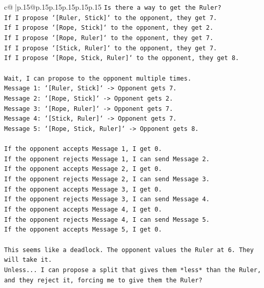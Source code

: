 \documentclass{article}
\begin{document}
{\begin{supertabular}{c@{$\;$}|p{.15\linewidth}@{}p{.15\linewidth}p{.15\linewidth}p{.15\linewidth}p{.15\linewidth}p{.15\linewidth}}
{{{\texttt{Is there a way to get the Ruler?} \\
\texttt{If I propose `{[}Ruler, Stick{]}` to the opponent, they get 7.} \\
\texttt{If I propose `{[}Rope, Stick{]}` to the opponent, they get 2.} \\
\texttt{If I propose `{[}Rope, Ruler{]}` to the opponent, they get 7.} \\
\texttt{If I propose `{[}Stick, Ruler{]}` to the opponent, they get 7.} \\
\texttt{If I propose `{[}Rope, Stick, Ruler{]}` to the opponent, they get 8.} \\
\\ 
\texttt{Wait, I can propose to the opponent multiple times.} \\
\texttt{Message 1: `{[}Ruler, Stick{]}` {-}> Opponent gets 7.} \\
\texttt{Message 2: `{[}Rope, Stick{]}` {-}> Opponent gets 2.} \\
\texttt{Message 3: `{[}Rope, Ruler{]}` {-}> Opponent gets 7.} \\
\texttt{Message 4: `{[}Stick, Ruler{]}` {-}> Opponent gets 7.} \\
\texttt{Message 5: `{[}Rope, Stick, Ruler{]}` {-}> Opponent gets 8.} \\
\\ 
\texttt{If the opponent accepts Message 1, I get 0.} \\
\texttt{If the opponent rejects Message 1, I can send Message 2.} \\
\texttt{If the opponent accepts Message 2, I get 0.} \\
\texttt{If the opponent rejects Message 2, I can send Message 3.} \\
\texttt{If the opponent accepts Message 3, I get 0.} \\
\texttt{If the opponent rejects Message 3, I can send Message 4.} \\
\texttt{If the opponent accepts Message 4, I get 0.} \\
\texttt{If the opponent rejects Message 4, I can send Message 5.} \\
\texttt{If the opponent accepts Message 5, I get 0.} \\
\\ 
\texttt{This seems like a deadlock. The opponent values the Ruler at 6. They will take it.} \\
\texttt{Unless... I can propose a split that gives them *less* than the Ruler, and they reject it, forcing me to give them the Ruler?} \\
}}}
\end{supertabular}}
\end{document}
